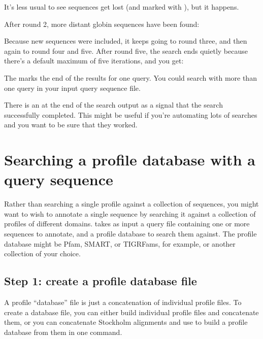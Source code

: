 It's less usual to see sequences get lost (and marked with \mono{-}),
but it happens.

After round 2, more distant globin sequences have been found:


Because new sequences were included, it keeps going to round three,
and then again to round four and five. After round five, the search
ends quietly because there's a default maximum of five iterations, and
you get:


The \mono{//} marks the end of the results for one query. You could
search with more than one query in your input query sequence
file. 

There is an \mono{[ok]} at the end of the search output as a signal
that the search successfully completed. This might be useful if you're
automating lots of searches and you want to be sure that they worked.



\section{Searching a profile database with a query sequence}

Rather than searching a single profile against a collection of
sequences, you might want to wish to annotate a single sequence by
searching it against a collection of profiles of different domains.
 takes as input a query file containing one or more
sequences to annotate, and a profile database to search them against.
The profile database might be Pfam, SMART, or TIGRFams, for example, or
another collection of your choice. 

\subsection{Step 1: create a profile database file}

A profile ``database'' file is just a concatenation of individual
profile files. To create a database file, you can either build
individual profile files and concatenate them, or you can concatenate
Stockholm alignments and use  to build a profile database
from them in one command.

